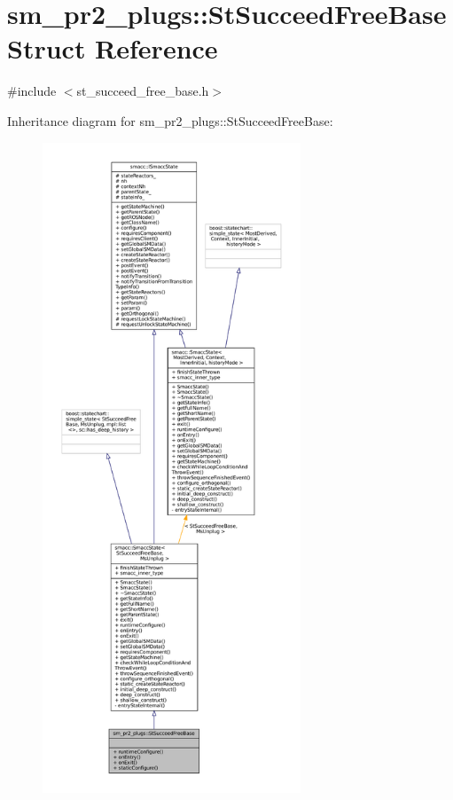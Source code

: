 \hypertarget{structsm__pr2__plugs_1_1StSucceedFreeBase}{}\section{sm\+\_\+pr2\+\_\+plugs\+:\+:St\+Succeed\+Free\+Base Struct Reference}
\label{structsm__pr2__plugs_1_1StSucceedFreeBase}


{\ttfamily \#include $<$st\+\_\+succeed\+\_\+free\+\_\+base.\+h$>$}



Inheritance diagram for sm\+\_\+pr2\+\_\+plugs\+:\+:St\+Succeed\+Free\+Base\+:
\nopagebreak
\begin{figure}[H]
\begin{center}
\leavevmode
\includegraphics[height=550pt]{structsm__pr2__plugs_1_1StSucceedFreeBase__inherit__graph}
\end{center}
\end{figure}


